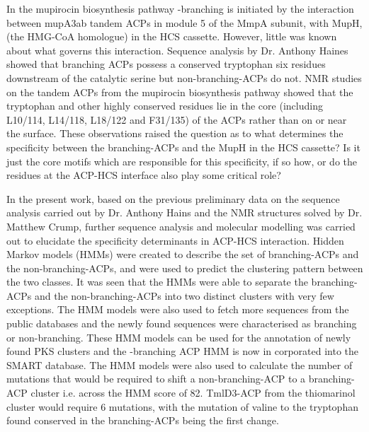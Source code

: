 In the mupirocin biosynthesis pathway \bet-branching is initiated by the interaction between mupA3ab tandem ACPs in module 5 of the MmpA subunit, with MupH, (the HMG-CoA homologue) in the HCS cassette. However, little was known about what governs this interaction. Sequence analysis by Dr. Anthony Haines showed that branching ACPs possess a conserved tryptophan six residues downstream of the catalytic serine but non-branching-ACPs do not. NMR studies on the tandem ACPs from the mupirocin biosynthesis pathway showed that the tryptophan and other highly conserved residues lie in the core (including L10/114, L14/118, L18/122 and F31/135) of the ACPs rather than on or near the surface. These observations raised the question as to what determines the specificity between the branching-ACPs and the MupH in the HCS cassette? Is it just the core motifs which are responsible for this specificity, if so how, or do the residues at the ACP-HCS interface also play some critical role?

In the present work, based on the previous preliminary data on the sequence analysis carried out by Dr. Anthony Hains and the NMR structures solved by Dr. Matthew Crump, further sequence analysis and molecular modelling was carried out to elucidate the specificity determinants in ACP-HCS interaction. Hidden Markov models (HMMs) were created to describe the set of branching-ACPs and the non-branching-ACPs, and were used to predict the clustering pattern between the two classes. It was seen that the HMMs were able to separate the branching-ACPs and the non-branching-ACPs into two distinct clusters with very few exceptions. The HMM models were also used to fetch more sequences from the public databases and the newly found sequences were characterised as branching or non-branching. These HMM models can be used for the annotation of newly found PKS clusters and the \bet-branching ACP HMM is now in corporated into the SMART database. The HMM models were also used to calculate the number of mutations that would be required to shift a non-branching-ACP to a branching-ACP cluster i.e. across the HMM score of 82. TmlD3-ACP from the thiomarinol cluster would require 6 mutations, with the mutation of valine to the tryptophan found conserved in the branching-ACPs being the first change.

